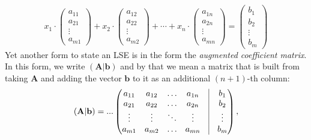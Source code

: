 \begin{equation}
x_1 \cdot \begin{pmatrix} a_{11} \\ a_{21} \\ \vdots \\ a_{m1} \end{pmatrix} + 
x_2 \cdot \begin{pmatrix} a_{12} \\ a_{22} \\ \vdots \\ a_{m2} \end{pmatrix} + 
\cdots +
x_n \cdot \begin{pmatrix} a_{1n} \\ a_{2n} \\ \vdots \\ a_{mn} \end{pmatrix} 
= 
\begin{pmatrix} b_1 \\ b_2 \\ \vdots \\ b_m \end{pmatrix}
\end{equation}
Yet another form to state an LSE is in the form the \emph{augmented coefficient matrix}. In this form, we write $(\mathbf{A|b})$ and by that we mean a matrix that is built from taking $\mathbf{A}$ and adding the vector $\mathbf{b}$ to it as an additional $(n+1)$-th column:
\begin{equation}
(\mathbf{A|b}) = ...
\begin{pmatrix}
a_{11} & a_{12} & \ldots & a_{1n} & \vline & b_1    \\
a_{21} & a_{22} & \ldots & a_{2n} & \vline & b_2    \\ 
\vdots & \vdots & \ddots & \vdots & \vline & \vdots \\
a_{m1} & a_{m2} & \ldots & a_{mn} & \vline & b_m  
\end{pmatrix},
\end{equation}










